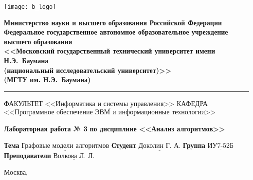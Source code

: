 \thispagestyle{empty}

\noindent \begin{minipage}{0.15\textwidth}
	\texttt{[image: b\_logo]}
\end{minipage}
\noindent\begin{minipage}{0.85\textwidth}\centering
	\textbf{Министерство науки и высшего образования Российской Федерации}\\
	\textbf{Федеральное государственное автономное образовательное учреждение высшего образования}\\
	\textbf{<<Московский государственный технический университет имени Н.Э.~Баумана}\\
	\textbf{(национальный исследовательский университет)>>}\\
	\textbf{(МГТУ им. Н.Э.~Баумана)}
\end{minipage}

\noindent\rule{\linewidth}{3pt}
\newline\newline
\noindent ФАКУЛЬТЕТ $\underline{\text{<<Информатика и системы управления>>}}$ \newline\newline
\noindent КАФЕДРА $\underline{\text{<<Программное обеспечение ЭВМ и информационные технологии>>}}$

\vspace{1cm}

\begin{center}
	\noindent\begin{minipage}{1.3\textwidth}\centering
		\Large\textbf{  Лабораторная работа № 3}\newline
		\textbf{по дисциплине <<Анализ алгоритмов>>}\newline\newline
	\end{minipage}
\end{center}

\noindent\textbf{Тема} $\underline{\text{Графовые модели алгоритмов}}$\newline\newline
\noindent\textbf{Студент} $\underline{\text{Доколин~Г.~А.}}$\newline\newline
\noindent\textbf{Группа} $\underline{\text{ИУ7-52Б}}$\newline\newline
\noindent\textbf{Преподаватели} $\underline{\text{Волкова~Л.~Л.}}$\newline

\begin{center}
	\vfill
	Москва,~\the\year
\end{center}
\clearpage

